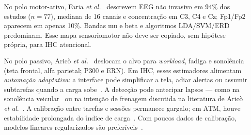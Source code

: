 \documentclass[12pt]{article}
\begin{document}
\begin{table}[htbp]
\centering
\scriptsize
\caption{S\'{i}ntese do corpus focal.}
\label{tab:corpus_sintese}
\end{table}

No polo motor-ativo, Faria \textit{et al.}~\cite{Faria2026} descrevem EEG n\~{a}o invasivo em 94\% dos estudos ($n=77$), mediana de 16 canais e concentra\c{c}\~{a}o em C3, C4 e Cz; Fp1/Fp2 aparecem em apenas 10\%. Bandas mu e beta e algoritmos LDA/SVM/ERD predominam. Esse mapa sensoriomotor n\~{a}o deve ser copiado, sem hip\'{o}tese pr\'{o}pria, para IHC atencional.

No polo passivo, Aric\`{o} \textit{et al.}~\cite{Arico2017} deslocam o alvo para \textit{workload}, fadiga e sonol\^{e}ncia (teta frontal, alfa parietal; P300 e ERN). Em IHC, esses estimadores alimentam \textit{automa\c{c}\~{a}o adaptativa}: a interface pode simplificar a tela, adiar alertas ou assumir subtarefas quando a carga sobe~\cite{Arico2017,Arico2016ATM}. A detec\c{c}\~{a}o pode antecipar lapsos --- como na sonol\^{e}ncia veicular~\cite{Arif2023} ou na inten\c{c}\~{a}o de frenagem discutida na literatura de Aric\`{o} \textit{et al.}~\cite{Haufe2014}. A calibra\c{c}\~{a}o entre tarefas e sess\~{o}es permanece gargalo; em ATM, houve estabilidade prolongada do \'{\i}ndice de carga~\cite{Arico2016ATM}. Com poucos dados de calibra\c{c}\~{a}o, modelos lineares regularizados s\~{a}o prefer\'{i}veis~\cite{Arico2017,Lotte2018}.
\end{document}
